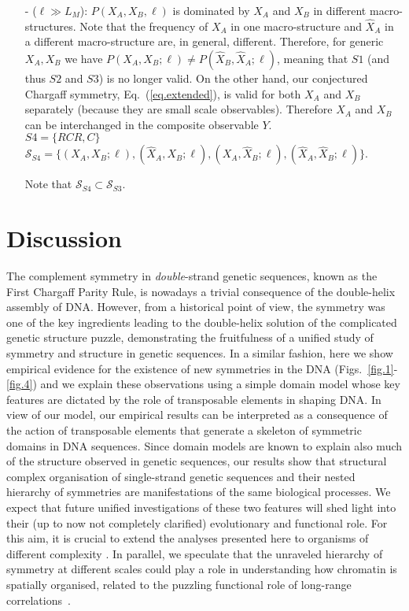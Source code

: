 \documentclass[fleqn,10pt]{wlscirep}
\begin{document}
\begin{itemize}
\item[-]($\ell \gg L_{M} $): $P(X_A,X_B,\ell)$ is dominated by $X_A$ and $X_B$ in different macro-structures. Note that the frequency of $X_A$ in one macro-structure and $\hat{X}_A$ in a different macro-structure are,  in general, different. Therefore,  for generic $X_A,X_B$ we have $P(X_A,X_B;\ell) \neq P(\hat{X}_B,\hat{X}_A;\ell)$, meaning that $S1$ (and thus $S2$ and $S3$) is no longer valid. On the other hand, our conjectured Chargaff symmetry, Eq.~(\ref{eq.extended}), is valid for both $X_A$ and $X_B$ separately (because they are small scale observables). Therefore $X_A$ and $X_B$  can be interchanged in the composite observable $Y$.
\\
$S4=\{RCR,C \}$\\
$\mathcal{S}_{S4}=\{ (X_A,X_B; \ell) , (\hat{X}_A,{X_B};\ell), ({X_A},\hat{X}_B;\ell), (\hat{X}_A,\hat{X}_B;\ell) \}$.

Note that $\mathcal{S}_{S4} \subset \mathcal{S}_{S3}$.

\end{itemize}



\section*{Discussion}
The complement symmetry in {\it double}-strand genetic sequences, known as the First Chargaff Parity Rule, is nowadays a trivial consequence of the double-helix assembly of DNA. However, from a historical point of view, the symmetry was one of the key ingredients leading to the double-helix solution of the complicated genetic structure puzzle, demonstrating the fruitfulness of a unified study of symmetry and structure in genetic sequences. In a similar fashion, here we show empirical evidence for the existence of new symmetries in the DNA (Figs.~\ref{fig.1}-\ref{fig.4}) and we explain these observations using a simple domain model whose key features are dictated by the role of  transposable elements in shaping DNA. In view of our model, our empirical results can be interpreted as a consequence of the action of transposable elements that generate a skeleton of symmetric domains in DNA sequences.
%
Since domain models are known to explain also much of the structure observed in genetic sequences, our results show that structural complex organisation of single-strand genetic sequences and their nested hierarchy of symmetries are  manifestations of the same biological processes. We expect that future unified investigations of these two features will shed light into their (up to now not completely clarified)  evolutionary and functional role.  For this aim, it is crucial to extend the analyses presented here to organisms of different complexity \cite{KFCHZZL09}. In parallel, we speculate that  the  unraveled hierarchy of symmetry at different scales could play a role in understanding how chromatin is spatially organised, related to the puzzling  functional role of long-range correlations~\cite{BWDSARSF08, AVAAdT11}.  
\end{document}
